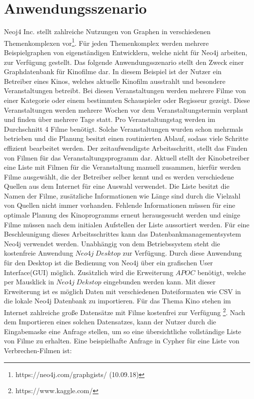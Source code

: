 \section{Anwendungsszenario}
Neoj4 Inc. stellt zahlreiche Nutzungen von Graphen in verschiedenen Themenkomplexen vor\footnote{https://neo4j.com/graphgists/ (10.09.18)}. Für jeden Themenkomplex werden mehrere Beispielgraphen von eigenständigen Entwicklern, welche nicht für Neo4j arbeiten, zur Verfügung gestellt. Das folgende Anwendungsszenario stellt den Zweck einer Graphdatenbank für Kinofilme dar.\newline
In diesem Beispiel ist der Nutzer ein Betreiber eines Kinos, welches aktuelle Kinofilm ausstrahlt und besondere Veranstaltungen betreibt. Bei diesen Veranstaltungen werden mehrere Filme von einer Kategorie oder einem bestimmten Schauspieler oder Regisseur gezeigt. Diese Veranstaltungen werden mehrere Wochen vor dem Veranstaltungstermin verplant und finden über mehrere Tage statt. Pro Veranstaltungstag werden im Durchschnitt 4 Filme benötigt. Solche Veranstaltungen wurden schon mehrmals betrieben und die Planung besitzt einen routinierten Ablauf, sodass viele Schritte effizient bearbeitet werden. Der zeitaufwendigste Arbeitsschritt, stellt das Finden von Filmen für das Veranstaltungsprogramm dar. \newline
Aktuell stellt der Kinobetreiber eine Liste mit Filmen für die Veranstaltung manuell zusammen, hierfür werden Filme ausgewählt, die der Betreiber selber kennt und es werden verschiedene Quellen aus dem Internet für eine Auswahl verwendet. Die Liste besitzt die Namen der Filme, zusätzliche Informationen wie Länge sind durch die Vielzahl von Quellen nicht immer vorhanden. Fehlende Informationen müssen für eine optimale Planung des Kinoprogramms erneut herausgesucht werden und einige Filme müssen nach dem initialen Aufstellen der Liste  aussortiert werden. \newline  
Für eine Beschleunigung dieses Arbeitsschrittes kann das Datenbankmanagementsystem Neo4j verwendet werden. Unabhängig von dem Betriebssystem steht die kostenfreie Anwendung $Neo4j\; Desktop$ zur Verfügung. Durch diese Anwendung für den Desktop ist die Bedienung von Neo4j über ein grafischen User Interface(GUI) möglich. Zusätzlich wird die Erweiterung $APOC$ benötigt, welche per Mausklick in $Neo4j\; Dekstop$ eingebunden werden kann. Mit dieser Erweiterung ist es möglich Daten mit verschiedenen Dateiformaten wie CSV in die lokale Neo4j Datenbank zu importieren. Für das Thema Kino stehen im Internet zahlreiche große Datensätze mit Filme kostenfrei zur Verfügung \footnote{https://www.kaggle.com/}. Nach dem Importieren eines solchen Datensatzes, kann der Nutzer durch die Eingabemaske eine Anfrage stellen, um so eine übersichtliche vollständige Liste von Filme zu erhalten. Eine beispielhafte Anfrage in Cypher für eine Liste von Verbrechen-Filmen ist: 
